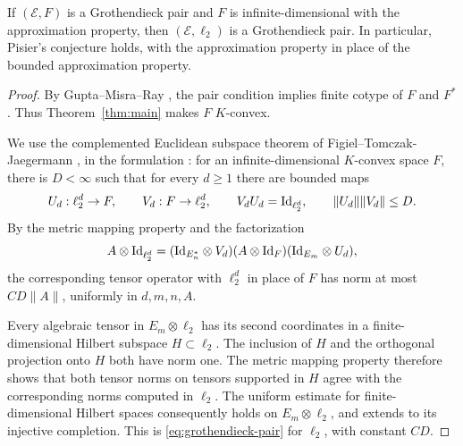 \begin{corollary}\label{cor:grothendieck}
If \((\mathcal E,F)\) is a Grothendieck pair and \(F\) is
infinite-dimensional with the approximation property, then
\((\mathcal E,\ell_2)\) is a Grothendieck pair.
In particular, Pisier's conjecture
\cite[Conjecture 1.4]{GMR25} holds, with the approximation property
in place of the bounded approximation property.
\end{corollary}
\begin{proof}
By Gupta--Misra--Ray \cite[Theorem 1.3]{GMR25}, the pair condition
implies finite cotype of \(F\) and \(F^*\).
Thus Theorem~\ref{thm:main} makes \(F\) \(K\)-convex.

We use the complemented Euclidean subspace theorem of
Figiel--Tomczak-Jaegermann \cite{FTJ79}, in the formulation
\cite[Theorem~4]{Pis84ICM}: for an infinite-dimensional
\(K\)-convex space \(F\), there is \(D<\infty\) such that for every
\(d\ge1\) there are bounded maps
\[
U_d:\ell_2^d\to F,\qquad V_d:F\to\ell_2^d,\qquad
V_dU_d=\mathrm{Id}_{\ell_2^d},\qquad \|U_d\|\|V_d\|\le D.
\]
By the metric mapping property and the factorization
\[
A\otimes\mathrm{Id}_{\ell_2^d}
=(\mathrm{Id}_{E_n^*}\otimes V_d)
 (A\otimes\mathrm{Id}_F)
 (\mathrm{Id}_{E_m}\otimes U_d),
\]
the corresponding tensor operator with \(\ell_2^d\) in place of
\(F\) has norm at most \(CD\|A\|\), uniformly in \(d,m,n,A\).

Every algebraic tensor in \(E_m\otimes\ell_2\) has its second
coordinates in a finite-dimensional Hilbert subspace \(H\subset\ell_2\).
The inclusion of \(H\) and the orthogonal projection onto \(H\)
both have norm one. The metric mapping property therefore shows
that both tensor norms on tensors supported in \(H\) agree with
the corresponding norms computed in \(\ell_2\).
The uniform estimate for finite-dimensional Hilbert spaces
consequently holds on \(E_m\otimes\ell_2\), and extends to its
injective completion. This is \eqref{eq:grothendieck-pair} for
\(\ell_2\), with constant \(CD\).
\end{proof}
